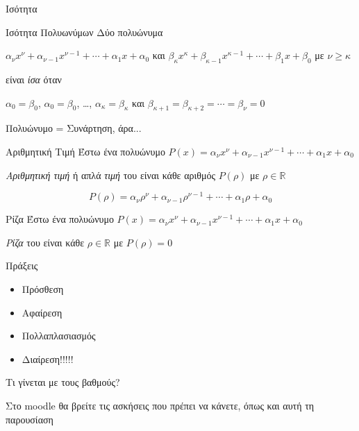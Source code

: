 \documentclass[greek]{beamer}
\begin{document}
\begin{frame}{Ισότητα}
    \begin{block}{Ισότητα Πολυωνύμων}
        Δύο πολυώνυμα

        $α_νx^ν+α_{ν-1}x^{ν-1}+\cdots+α_1x+α_0$ και $β_κx^κ+β_{κ-1}x^{κ-1}+\cdots+β_1x+β_0$ με $ν\ge κ$

        είναι \emph{ίσα} όταν

        $α_0=β_0$, $α_0=β_0$, \ldots, $α_κ=β_κ$ και $β_{κ+1}=β_{κ+2}=\cdots=β_ν=0$
    \end{block}
\end{frame}

\begin{frame}{Πολυώνυμο = Συνάρτηση, άρα...}
    \begin{block}{Αριθμητική Τιμή}
        Έστω ένα πολυώνυμο $P(x)=α_νx^ν+α_{ν-1}x^{ν-1}+\cdots+α_1x+α_0$

        \emph{Αριθμητική τιμή} ή απλά \emph{τιμή} του είναι κάθε αριθμός $P(ρ)$ με $ρ\in\mathbb{R}$

        $$P(ρ)=α_νρ^ν+α_{ν-1}ρ^{ν-1}+\cdots+α_1ρ+α_0$$
    \end{block}

    \begin{block}{Ρίζα}
        Έστω ένα πολυώνυμο $P(x)=α_νx^ν+α_{ν-1}x^{ν-1}+\cdots+α_1x+α_0$

        \emph{Ρίζα} του είναι κάθε $ρ\in\mathbb{R}$ με $P(ρ)=0$
    \end{block}
\end{frame}

\begin{frame}{Πράξεις}
    \begin{block}{}
        \begin{itemize}
            \item<1-> Πρόσθεση
            \item<2-> Αφαίρεση
            \item<3-> Πολλαπλασιασμός
            \item<4-> Διαίρεση!!!!!
        \end{itemize}
    \end{block}
     Τι γίνεται με τους βαθμούς?
\end{frame}

\begin{frame}[noframenumbering]
    Στο moodle θα βρείτε τις ασκήσεις που πρέπει να κάνετε, όπως και αυτή τη παρουσίαση
\end{frame}
\end{document}
